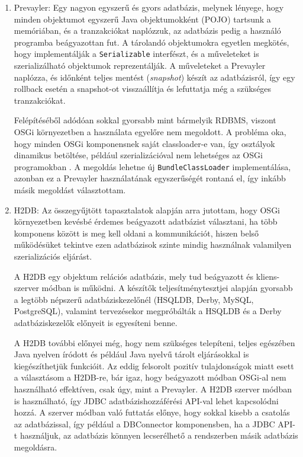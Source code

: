 \begin{enumerate}
	\item Prevayler: Egy nagyon egyszerű és gyors adatbázis, melynek lényege, hogy minden objektumot egyszerű Java objektumokként (POJO) tartsunk a memóriában, és a tranzakciókat naplózzuk, az adatbázis pedig a használó programba beágyazottan fut. A tárolandó objektumokra egyetlen megkötés, hogy implementálják a \texttt{Serializable} interfészt, és a műveleteket is szerializálható objektumok reprezentálják. A műveleteket a Prevayler naplózza, és időnként teljes mentést (\textit{snapshot}) készít az adatbázisról, így egy rollback esetén a snapshot-ot visszaállítja és lefuttatja még a szükséges tranzakciókat.
	
Felépítéséből adódóan sokkal gyorsabb mint bármelyik RDBMS, viszont OSGi környezetben a használata egyelőre nem megoldott. A probléma oka, hogy minden OSGi komponensnek saját classloader-e van, így osztályok dinamikus betöltése, például szerializációval nem lehetséges az OSGi programokban \cite{hall04osgi}. A megoldás lehetne új \texttt{BundleClassLoader} implementálása, azonban ez a Prevayler használatának egyszerűségét rontaná el, így inkább másik megoldást választottam.

    \item H2DB: Az összegyűjtött tapasztalatok alapján arra jutottam, hogy OSGi környezetben kevésbé érdemes beágyazott adatbázist választani, ha több komponens között is meg kell oldani a kommunikációt, hiszen belső működésüket tekintve ezen adatbázisok szinte mindig használnak valamilyen szerializációs eljárást.

    A H2DB egy objektum relációs adatbázis, mely tud beágyazott és kliens-szerver módban is működni. A készítők teljesítménytesztjei alapján gyorsabb a legtöbb népszerű adatbáziskezelőnél (HSQLDB, Derby, MySQL, PostgreSQL), valamint tervezésekor megpróbálták a HSQLDB és a Derby adatbáziskezelők előnyeit is egyesíteni benne.

A H2DB további előnyei még, hogy nem szükséges telepíteni, teljes egészében Java nyelven íródott és például Java nyelvű tárolt eljárásokkal is kiegészíthetjük funkcióit. Az eddig felsorolt pozitív tulajdonságok miatt esett a választásom a H2DB-re, bár igaz, hogy beágyazott módban OSGi-al nem használható effektíven, csak úgy, mint a Prevayler. A H2DB szerver módban is használható, így JDBC adatbázishozzáférési API-val lehet kapcsolódni hozzá. A szerver módban való futtatás előnye, hogy sokkal kisebb a csatolás az adatbázissal, így például a DBConnector komponensben, ha a JDBC API-t használjuk, az adatbázis könnyen lecserélhető a rendszerben másik adatbázis megoldásra.

\end{enumerate}

